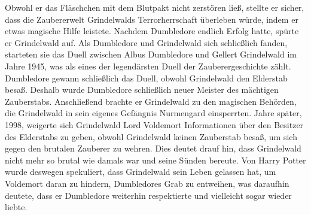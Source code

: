 \documentclass[a4paper, 10pt]{article}
\begin{document}
Obwohl er das Fläschchen mit dem Blutpakt nicht zerstören ließ, stellte er sicher, dass die Zaubererwelt Grindelwalds Terrorherrschaft überleben würde, indem er etwas magische Hilfe leistete. Nachdem Dumbledore endlich Erfolg hatte, spürte er Grindelwald auf. Als Dumbledore und Grindelwald sich schließlich fanden, starteten sie das Duell zwischen Albus Dumbledore und Gellert Grindelwald im Jahre 1945, was als eines der legendärsten Duell der Zauberergeschichte zählt. Dumbledore gewann schließlich das Duell, obwohl Grindelwald den Elderstab besaß. Deshalb wurde Dumbledore schließlich neuer Meister des mächtigen Zauberstabs. Anschließend brachte er Grindelwald zu den magischen Behörden, die Grindelwald in sein eigenes Gefängnis Nurmengard einsperrten.
\vspace{10pt}
\newline
{}  
Jahre später, 1998, weigerte sich Grindelwald Lord Voldemort Informationen über den Besitzer des Elderstabs zu geben, obwohl Grindelwald keinen Zauberstab besaß, um sich gegen den brutalen Zauberer zu wehren. Dies deutet drauf hin, dass Grindelwald nicht mehr so brutal wie damals war und seine Sünden bereute. Von Harry Potter wurde deswegen spekuliert, dass Grindelwald sein Leben gelassen hat, um Voldemort daran zu hindern, Dumbledores Grab zu entweihen, was daraufhin deutete, dass er Dumbledore weiterhin respektierte und vielleicht sogar wieder liebte.
\end{document}
